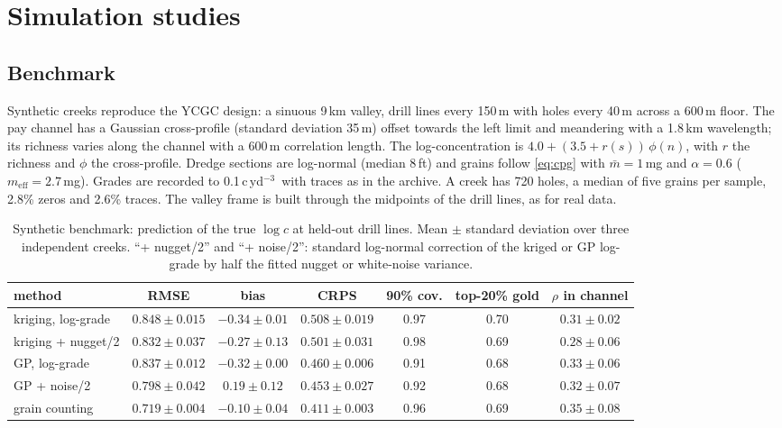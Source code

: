 \documentclass[11pt,a4paper]{article}
\theoremstyle{remark}
\newcommand{\meff}{m_{\mathrm{eff}}}
\newcommand{\mbar}{\bar m}
\newcommand{\cyd}{c\,yd$^{-3}$}
\begin{document}
\section{Simulation studies}\label{sec:sim}

\subsection{Benchmark}\label{sec:benchmark}

Synthetic creeks reproduce the YCGC design: a sinuous 9\,km valley, drill lines every 150\,m with holes every 40\,m across a 600\,m floor. The pay channel has a Gaussian cross-profile (standard deviation 35\,m) offset towards the left limit and meandering with a 1.8\,km wavelength; its richness varies along the channel with a 600\,m correlation length. The log-concentration is $4.0 + (3.5 + r(s))\,\phi(n)$, with $r$ the richness and $\phi$ the cross-profile. Dredge sections are log-normal (median 8\,ft) and grains follow \eqref{eq:cpg} with $\mbar = 1$\,mg and $\alpha = 0.6$ ($\meff = 2.7$\,mg). Grades are recorded to 0.1\,\cyd\ with traces as in the archive. A creek has 720 holes, a median of five grains per sample, 2.8\% zeros and 2.6\% traces. The valley frame is built through the midpoints of the drill lines, as for real data.

\begin{table}[t]
\centering
\small
\caption{Synthetic benchmark: prediction of the true $\log c$ at held-out drill lines. Mean $\pm$ standard deviation over three independent creeks. ``+ nugget/2'' and ``+ noise/2'': standard log-normal correction of the kriged or GP log-grade by half the fitted nugget or white-noise variance.}
\label{tab:synthetic}
\setlength{\tabcolsep}{2.2pt}
\begin{tabular}{lcccccc}
\toprule
method & RMSE & bias & CRPS & 90\% cov. & top-20\% gold & $\rho$ in channel \\
\midrule
kriging, log-grade & $0.848 \pm 0.015$ & $-0.34 \pm 0.01$ & $0.508 \pm 0.019$ & 0.97 & 0.70 & $0.31 \pm 0.02$ \\
kriging + nugget/2 & $0.832 \pm 0.037$ & $-0.27 \pm 0.13$ & $0.501 \pm 0.031$ & 0.98 & 0.69 & $0.28 \pm 0.06$ \\
GP, log-grade & $0.837 \pm 0.012$ & $-0.32 \pm 0.00$ & $0.460 \pm 0.006$ & 0.91 & 0.68 & $0.33 \pm 0.06$ \\
GP + noise/2 & $0.798 \pm 0.042$ & $0.19 \pm 0.12$ & $0.453 \pm 0.027$ & 0.92 & 0.68 & $0.32 \pm 0.07$ \\
grain counting & $\mathbf{0.719 \pm 0.004}$ & $\mathbf{-0.10 \pm 0.04}$ & $\mathbf{0.411 \pm 0.003}$ & 0.96 & 0.69 & $0.35 \pm 0.08$ \\
\bottomrule
\end{tabular}
\end{table}
\end{document}

